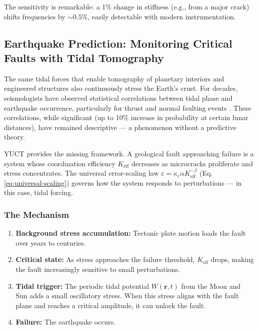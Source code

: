\documentclass[12pt,a4paper]{article}
\theoremstyle{remark}
\begin{document}
	The sensitivity is remarkable: a 1\% change in stiffness (e.g., from a major crack) shifts frequencies by \(\sim 0.5\%\), easily detectable with modern instrumentation.
	
	\subsection{Earthquake Prediction: Monitoring Critical Faults with Tidal Tomography}
	\label{sec:earthquakes}
	
	The same tidal forces that enable tomography of planetary interiors and engineered structures also continuously stress the Earth's crust. For decades, seismologists have observed statistical correlations between tidal phase and earthquake occurrence, particularly for thrust and normal faulting events \cite{Tanaka2012, Tolstoy2013, Sibgatulin2014, RAN2025}. These correlations, while significant (up to 10\% increase in probability at certain lunar distances), have remained descriptive — a phenomenon without a predictive theory.
	
	YUCT provides the missing framework. A geological fault approaching failure is a system whose coordination efficiency \(K_{\mathrm{eff}}\) decreases as microcracks proliferate and stress concentrates. The universal error-scaling law \(\varepsilon = \kappa_c \alpha K_{\mathrm{eff}}^{-\beta}\) (Eq. \ref{eq:universal-scaling}) governs how the system responds to perturbations — in this case, tidal forcing.
	
	\subsubsection{The Mechanism}
	
	\begin{enumerate}
		\item \textbf{Background stress accumulation:} Tectonic plate motion loads the fault over years to centuries.
		\item \textbf{Critical state:} As stress approaches the failure threshold, \(K_{\mathrm{eff}}\) drops, making the fault increasingly sensitive to small perturbations.
		\item \textbf{Tidal trigger:} The periodic tidal potential \(W(\mathbf{r},t)\) from the Moon and Sun adds a small oscillatory stress. When this stress aligns with the fault plane and reaches a critical amplitude, it can unlock the fault.
		\item \textbf{Failure:} The earthquake occurs.
	\end{enumerate}
	
\end{document}
